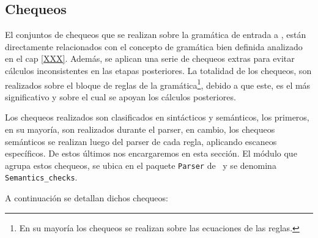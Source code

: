 \subsection*{Chequeos}
\label{subsec:check}

El conjuntos de chequeos que se realizan sobre la gramática de entrada a \maggen, están directamente relacionados con el concepto de gramática bien definida analizado en el cap \ref{XXX}. Además, se aplican una serie de chequeos extras para evitar cálculos inconsistentes en las etapas posteriores. La totalidad de los chequeos, son realizados sobre el bloque de reglas de la gramática\footnote{En su mayoría los chequeos se realizan sobre las ecuaciones de las reglas.}, debido a que este, es el más significativo y sobre el cual se apoyan los cálculos posteriores.

Los chequeos realizados son clasificados en sintácticos y semánticos, los primeros, en su mayoría, son realizados durante el parser, en cambio, los chequeos semánticos se realizan luego del parser de cada regla, aplicando escaneos específicos. De estos últimos nos encargaremos en esta sección.
El módulo que agrupa estos chequeos, se ubica en el paquete \texttt{Parser} de \maggen\ y se denomina \texttt{Semantics\_checks}.

A continuación se detallan dichos chequeos:

